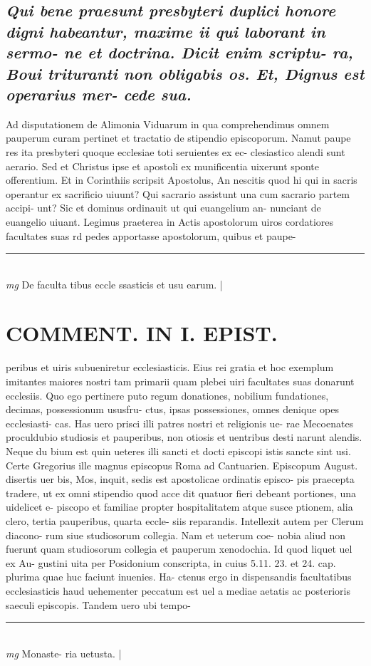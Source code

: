 \documentclass{article}
\begin{document}
\begin{pages}
\subsection*{\textit{Qui bene praesunt presbyteri duplici honore digni habeantur, maxime ii qui laborant in sermo- ne et doctrina. Dicit enim scriptu- ra, Boui trituranti non obligabis os. Et, Dignus est operarius mer- cede sua. }}\pstart Ad disputationem de Alimonia Viduarum in qua comprehendimus omnem pauperum curam pertinet et tractatio de stipendio episcoporum. Namut paupe res ita presbyteri quoque ecclesiae toti seruientes ex ec- clesiastico alendi sunt aerario. Sed et Christus ipse et apostoli ex munificentia uixerunt sponte offerentium. Et in Corinthiis scripsit Apostolus, An nescitis quod hi qui in sacris operantur ex sacrificio uiuunt? Qui sacrario assistunt una cum sacrario partem accipi- unt? Sic et dominus ordinauit ut qui euangelium an- nunciant de euangelio uiuant. Legimus praeterea in Actis apostolorum uiros cordatiores facultates suas rd pedes apportasse apostolorum, quibus et paupe-  \pend
\vspace{0.5cm}\noindent
\vspace{0.2cm}\rule{1cm}{0.2pt}\\ 
\hspace{0.2cm}\textit{mg}
\footnotesize De faculta tibus eccle ssasticis et usu earum. 
\normalsize| 
\section*{COMMENT. IN I. EPIST. }\pstart peribus et uiris subueniretur ecclesiasticis. Eius rei gratia et hoc exemplum imitantes maiores nostri tam primarii quam plebei uiri facultates suas donarunt ecclesiis. Quo ego pertinere puto regum donationes, nobilium fundationes, decimas, possessionum ususfru- ctus, ipsas possessiones, omnes denique opes ecclesiasti- cas. Has uero prisci illi patres nostri et religionis ue- rae Mecoenates proculdubio studiosis et pauperibus, non otiosis et uentribus desti narunt alendis. Neque du bium est quin ueteres illi sancti et docti episcopi istis sancte sint usi. Certe Gregorius ille magnus episcopus Roma ad Cantuarien. Episcopum August. disertis uer bis, Mos, inquit, sedis est apostolicae ordinatis episco- pis praecepta tradere, ut ex omni stipendio quod acce dit quatuor fieri debeant portiones, una uidelicet e- piscopo et familiae propter hospitalitatem atque susce ptionem, alia clero, tertia pauperibus, quarta eccle- siis reparandis. Intellexit autem per Clerum diacono- rum siue studiosorum collegia. Nam et ueterum coe- nobia aliud non fuerunt quam studiosorum collegia et pauperum xenodochia. Id quod liquet uel ex Au- gustini uita per Posidonium conscripta, in cuius 5.11. 23. et 24. cap. plurima quae huc faciunt inuenies. Ha- ctenus ergo in dispensandis facultatibus ecclesiasticis haud uehementer peccatum est uel a mediae aetatis ac posterioris saeculi episcopis. Tandem uero ubi tempo-  \pend
\vspace{0.5cm}\noindent
\vspace{0.2cm}\rule{1cm}{0.2pt}\\ 
\hspace{0.2cm}\textit{mg}
\footnotesize Monaste- ria uetusta. 
\normalsize| 

\end{pages}
\end{document}
